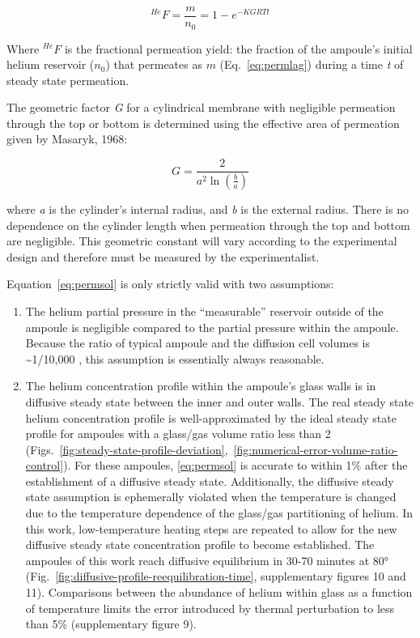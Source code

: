 \begin{equation}
\label{eq:permsol}
^{He}F = \frac{m}{n_{0}} = 1 - e^{- KGRTt}
\end{equation}

Where \(^{He}F\) is the fractional permeation yield: the fraction of the ampoule's initial helium reservoir (\(n_{0}\)) that permeates as \(m\) (Eq.~\eqref{eq:permlag}) during a time \emph{t} of steady state permeation.

The geometric factor \emph{G} for a cylindrical membrane with negligible permeation through the top or bottom is determined using the effective area of permeation given by Masaryk, 1968:

\begin{equation}
\label{eq:geomfactor}
G = \frac{2}{a^{2}\ln\left( \frac{b}{a} \right)}
\end{equation}

where \emph{a} is the cylinder's internal radius, and \emph{b} is the external radius. There is no dependence on the cylinder length when permeation through the top and bottom are negligible. This geometric constant will vary according to the experimental design and therefore must be measured by the experimentalist.

Equation~\eqref{eq:permsol} is only strictly valid with two assumptions:

\begin{enumerate}
\def\labelenumi{\arabic{enumi}.}
\item
  The helium partial pressure in the ``measurable'' reservoir outside of the ampoule is negligible compared to the partial pressure within the ampoule. Because the ratio of typical ampoule and the diffusion cell volumes is \textasciitilde1/10,000 \citep{farley1999}, this assumption is essentially always reasonable.
\item
  The helium concentration profile within the ampoule's glass walls is in diffusive steady state between the inner and outer walls. The real steady state helium concentration profile is well-approximated by the ideal steady state profile for ampoules with a glass/gas volume ratio less than 2 (Figs.~\ref{fig:steady-state-profile-deviation},~\ref{fig:numerical-error-volume-ratio-control}). For these ampoules, \eqref{eq:permsol} is accurate to within 1\% after the establishment of a diffusive steady state. Additionally, the diffusive steady state assumption is ephemerally violated when the temperature is changed due to the temperature dependence of the glass/gas partitioning of helium. In this work, low-temperature heating steps are repeated to allow for the new diffusive steady state concentration profile to become established. The ampoules of this work reach diffusive equilibrium in 30-70 minutes at 80° (Fig.~\ref{fig:diffusive-profile-reequilibration-time}, supplementary figures 10 and 11). Comparisons between the abundance of helium within glass as a function of temperature limits the error introduced by thermal perturbation to less than 5\% (supplementary figure 9).
\end{enumerate}

